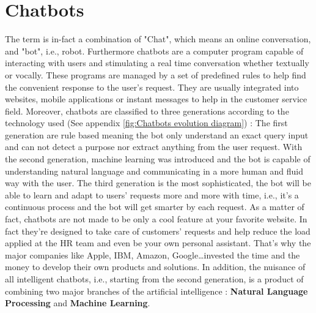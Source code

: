 \section{Chatbots}
The term is in-fact a combination of "Chat", which means an online conversation, and "bot", i.e., robot. Furthermore chatbots are a computer program capable of interacting with users and stimulating a real time conversation whether textually or vocally. These programs are managed by a set of predefined rules to help find the convenient response to the user's request. They are usually integrated into websites, mobile applications or instant messages to help in the customer service field. Moreover, chatbots are classified to three generations according to the technology used (See appendix \ref{fig:Chatbots evolution diagram}) : The first generation are rule based meaning the bot only understand an exact query input and can not detect a purpose nor extract anything from the user request. With the second generation, machine learning was introduced and the bot is capable of understanding natural language and communicating in a more human and fluid way with the user. The third generation is the most sophisticated, the bot will be able to learn and adapt to users' requests more and more with time, i.e., it's a continuous process and the bot will get smarter by each request\cite{3}.
As a matter of fact, chatbots are not made to be only a cool feature at your favorite website. In fact they're designed to take care of customers' requests and help reduce the load applied at the HR team and even be your own personal assistant. That's why the major companies like Apple, IBM, Amazon, Google\ldots invested the time and the money to develop their own products and solutions. In addition, the nuisance of all intelligent chatbots, i.e., starting from the second generation, is a product of combining two major branches of the artificial intelligence : \textbf{Natural Language Processing} and \textbf{Machine Learning}.



